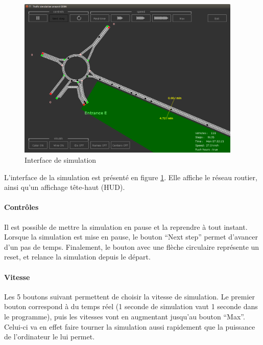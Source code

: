 \documentclass[a4paper,11pt, titlepage]{extarticle}
\begin{document}
\begin{figure}[!h]
  \begin{center}
    \includegraphics[width=0.95\textwidth]{interface_sim.png}
  \end{center}
  \caption{Interface de simulation}
  \label{imgSimulation}
\end{figure}

L'interface de la simulation est présenté en figure \ref{imgSimulation}. Elle affiche le réseau routier, ainsi qu'un affichage tête-haut (HUD).

\paragraph{Contrôles}

Il est possible de mettre la simulation en pause et la reprendre à tout instant. Lorsque la simulation est mise en pause, le bouton ``Next step'' permet d'avancer d'un pas de temps. Finalement, le bouton avec une flèche circulaire représente un reset, et relance la simulation depuis le départ.

\paragraph{Vitesse}

Les 5 boutons suivant permettent de choisir la vitesse de simulation. Le premier bouton correspond à du temps réel (1 seconde de simulation vaut 1 seconde dans le programme), puis les vitesses vont en augmentant jusqu'au bouton ``Max''. Celui-ci va en effet faire tourner la simulation aussi rapidement que la puissance de l'ordinateur le lui permet.
\end{document}
